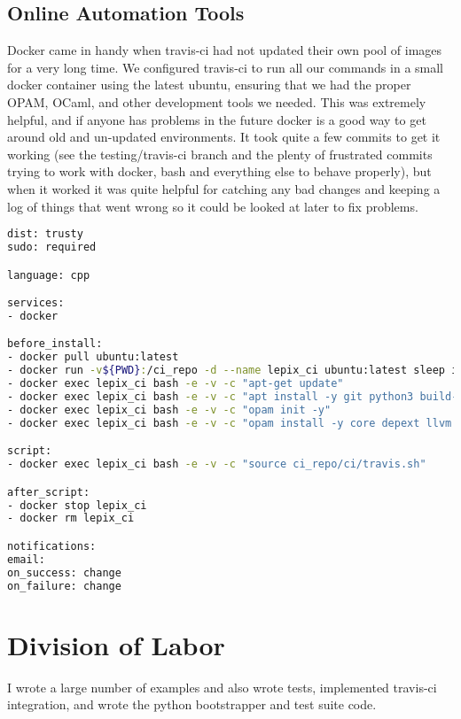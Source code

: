 \subsection{Online Automation Tools}
Docker came in handy when travis-ci had not updated their own pool of images for a very long time. We configured travis-ci to run all our commands in a small docker container using the latest ubuntu, ensuring that we had the proper OPAM, OCaml, and other development tools we needed. This was extremely helpful, and if anyone has problems in the future docker is a good way to get around old and un-updated environments. It took quite a few commits to get it working (see the testing/travis-ci branch and the plenty of frustrated commits trying to work with docker, bash and everything else to behave properly), but when it worked it was quite helpful for catching any bad changes and keeping a log of things that went wrong so it could be looked at later to fix problems.

\pagebreak{}

\begin{lstlisting}[language=bash, caption=.travis.yml]
dist: trusty
sudo: required

language: cpp

services:
- docker

before_install:
- docker pull ubuntu:latest
- docker run -v${PWD}:/ci_repo -d --name lepix_ci ubuntu:latest sleep infinity
- docker exec lepix_ci bash -e -v -c "apt-get update"
- docker exec lepix_ci bash -e -v -c "apt install -y git python3 build-essential m4 autotools-dev autoconf pkg-config ocaml menhir opam llvm llvm-dev llvm.3.8"
- docker exec lepix_ci bash -e -v -c "opam init -y"
- docker exec lepix_ci bash -e -v -c "opam install -y core depext llvm.3.8"

script:
- docker exec lepix_ci bash -e -v -c "source ci_repo/ci/travis.sh"

after_script:
- docker stop lepix_ci
- docker rm lepix_ci

notifications:
email:
on_success: change
on_failure: change
\end{lstlisting}

\section{Division of Labor}
I wrote a large number of examples and also wrote tests, implemented travis-ci integration, and wrote the python bootstrapper and test suite code.

